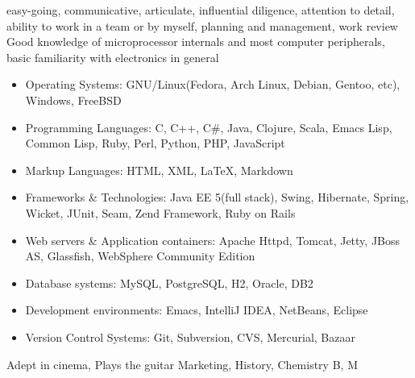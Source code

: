 \ecvlanguageheader{(*)}
\ecvlanguagefooter{(*)}
\ecvitem{}{}
\ecvitem{}{}
{
  easy-going, communicative, articulate, influential  
}
{
  diligence, attention to detail, ability to work in a team or by
  myself, planning and management, work review
}
{
  Good knowledge of microprocessor internals and most computer
  peripherals, basic familiarity with electronics in general
}
{
  \begin{itemize}
  \item Operating Systems: GNU/Linux(Fedora, Arch Linux, Debian,
    Gentoo, etc), Windows, FreeBSD
  \item Programming Languages: C, C++, C\#, Java, Clojure, Scala,
    Emacs Lisp, Common Lisp, Ruby, Perl, Python, PHP, JavaScript
  \item Markup Languages: HTML, XML, \LaTeX, Markdown
  \item Frameworks \& Technologies: Java EE 5(full stack), Swing, Hibernate,
    Spring, Wicket, JUnit, Seam, Zend Framework, Ruby on Rails
  \item Web servers \& Application containers: Apache Httpd, Tomcat,
    Jetty, JBoss AS, Glassfish, WebSphere Community Edition
  \item Database systems: MySQL, PostgreSQL, H2, Oracle, DB2
  \item Development environments: Emacs, IntelliJ IDEA, NetBeans, Eclipse 
  \item Version Control Systems: Git, Subversion, CVS, Mercurial,
    Bazaar
  \end{itemize}
}
{
  Adept in cinema, Plays the guitar
}
{
  Marketing, History, Chemistry
}
{B, M}

\ecvitem{}{}
\ecvitem{}{}

